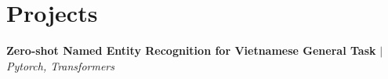 \section{Projects}
\resumeSubHeadingListStart

    \resumeProjectHeading
    {\textbf{Zero-shot Named Entity Recognition for Vietnamese General Task} $|$ \emph{Pytorch, Transformers}}    {}
    \resumeItemListStart
    \resumeItemListEnd

\resumeSubHeadingListEnd